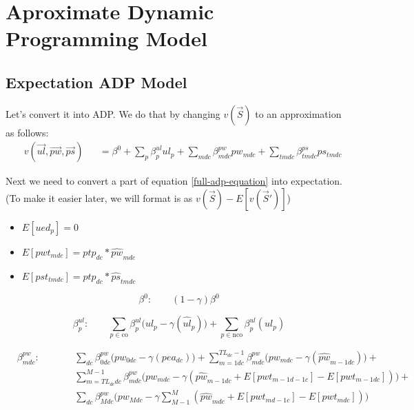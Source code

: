 \documentclass{article}
\begin{document}
\section{Aproximate Dynamic Programming Model}
\subsection{Expectation ADP Model}
Let's convert it into ADP. We do that by changing $v(\vec{S})$ to an approximation as follows:
\begin{equation}\begin{alignedat}{10}
	& v(\vec{ul}, \vec{pw}, \vec{ps}) 
		&& =  \beta^0 + \sum_{p} \beta_{p}^{ul} ul_{p} +
			\sum_{mdc} \beta_{mdc}^{pw} pw_{mdc}  + 
			\sum_{tmdc} \beta_{tmdc}^{ps} ps_{tmdc}
\end{alignedat} \end{equation}

Next we need to convert a part of equation \ref{full-adp-equation} into expectation. \\ 
(To make it easier later, we will format is as $v(\vec{S}) - E[v(\vec{S}')]$)

\begin{itemize}
	\item $E[ued_p] = 0$
	\item $E[pwt_{mdc}] = ptp_{dc} * \hat{pw}_{mdc}$ 
	\item $E[pst_{tmdc}] = ptp_{dc} * \hat{ps}_{tmdc}$ 
\end{itemize}

\begin{fleqn}[\parindent]
\begin{equation}
	\beta^{0}: \qquad (1-\gamma) \beta^{0}
\end{equation}
\end{fleqn}

\begin{fleqn}[\parindent]
\begin{equation}
\beta^{ul}_{p}: \qquad 
	\sum_{p \in \text{co}} \beta_{p}^{ul} \Big( ul_{p} - \gamma ( \hat{ul}_{p}) \Big) + 
	\sum_{p \in \text{nco}} \beta_{p}^{ul} ( ul_{p}) 
\end{equation}
\end{fleqn}

\begin{fleqn}[\parindent]
\begin{equation}\begin{alignedat}{10}
& \beta^{pw}_{mdc}: \qquad 
	&& 	\sum_{dc} \beta_{0dc}^{pw} \Big( pw_{0dc} - \gamma (pea_{dc}) \Big) +
	\sum_{m=1dc}^{TL_{dc}-1} \beta_{mdc}^{pw} 
	\Big( pw_{mdc} - \gamma 
		(\hat{pw}_{m-1dc}) \Big) + \\
	& && \sum_{m=TL_{dc}dc}^{M-1} \beta_{mdc}^{pw} 
		\Big( pw_{mdc} - \gamma 
		(\hat{pw}_{m-1dc} + E[pwt_{m-1d-1c}] - E[pwt_{m-1dc}]) \Big) + \\
	& && \sum_{dc} \beta_{Mdc}^{pw} 
		\Big( pw_{Mdc} - \gamma \sum_{M-1}^{M}
		(\hat{pw}_{mdc} + E[pwt_{md-1c}] - E[pwt_{mdc}]) \Big)
\end{alignedat} \end{equation}
\end{fleqn}
\end{document}
